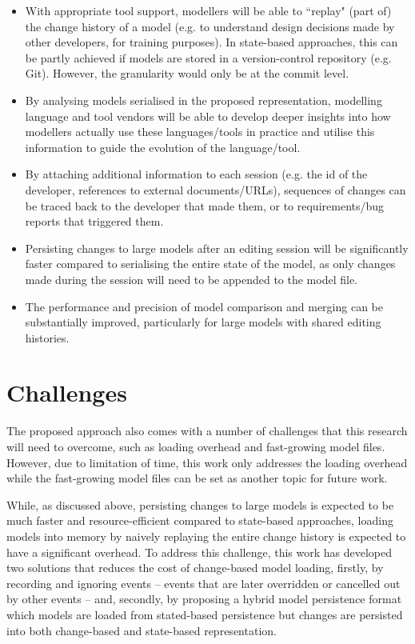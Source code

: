 \begin{itemize}
    \item With appropriate tool support, modellers will be able to ``replay" (part of) the change history of a model (e.g. to understand design decisions made by other developers, for training purposes). In state-based approaches, this can be partly achieved if models are stored in a version-control repository (e.g. Git). However, the granularity would only be at the commit level.
    \item By analysing models serialised in the proposed representation, modelling language and tool vendors will be able to develop deeper insights into how modellers actually use these languages/tools in practice and utilise this information to guide the evolution of the language/tool.
    \item By attaching additional information to each session (e.g. the id of the developer, references to external documents/URLs), sequences of changes can be traced back to the developer that made them, or to requirements/bug reports that triggered them.
    \item Persisting changes to large models after an editing session will be significantly faster compared to serialising the entire state of the model, as only changes made during the session will need to be appended to the model file.
    \item The performance and precision of model comparison and merging can be substantially improved, particularly for large models with shared editing histories.
\end{itemize}

\section{Challenges}
\label{sec:challenges}
The proposed approach also comes with a number of challenges that this research will need to overcome, such as loading overhead and fast-growing model files. However, due to limitation of time, this work only addresses the loading overhead while the fast-growing model files can be set as another topic for future work.  

While, as discussed above, persisting changes to large models is expected to be much faster and resource-efficient compared to state-based approaches, loading models into memory by naively replaying the entire change history is expected to have a significant overhead. To address this challenge, this work has developed two solutions that reduces the cost of change-based model loading, firstly, by recording and ignoring events -- events that are later overridden or cancelled out by other events -- and, secondly, by proposing a hybrid model persistence format which models are loaded from stated-based persistence but changes are persisted into both change-based and state-based representation. 

